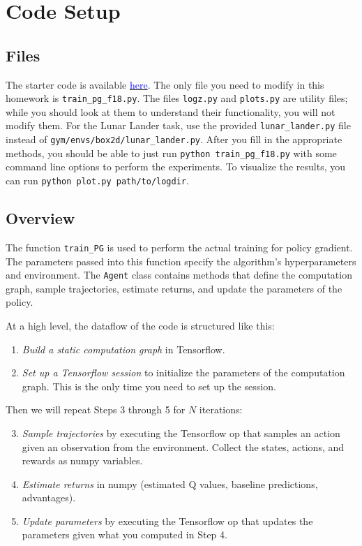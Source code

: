 \documentclass[12pt]{article}
\begin{document}
\section{Code Setup}
\subsection{Files}
The starter code is available \href{https://github.com/berkeleydeeprlcourse/homework/tree/master/hw2}{\textcolor{blue}{here}}.
The only file you need to modify in this homework is \verb|train_pg_f18.py|. The files \verb|logz.py| and \verb|plots.py| are utility files; while you should look at them to understand their functionality, you will not modify them. For the Lunar Lander task, use the provided \verb|lunar_lander.py| file instead of \verb|gym/envs/box2d/lunar_lander.py|. After you fill in the appropriate methods, you should be able to just run \verb|python train_pg_f18.py| with some command line options to perform the experiments. To visualize the results, you can run \verb|python plot.py path/to/logdir|.

\subsection{Overview}
The function \verb|train_PG| is used to perform the actual training for policy gradient. The parameters passed into this function specify the algorithm's hyperparameters and environment. The \verb|Agent| class contains methods that define the computation graph, sample trajectories, estimate returns, and update the parameters of the policy.

At a high level, the dataflow of the code is structured like this:
\begin{enumerate}
    \item \textit{Build a static computation graph} in Tensorflow.
    \item \textit{Set up a Tensorflow session} to initialize the parameters of the computation graph. This is the only time you need to set up the session.
\end{enumerate}
Then we will repeat Steps 3 through 5 for $N$ iterations:
\begin{enumerate}\setcounter{enumi}{2}
    \item \textit{Sample trajectories} by executing the Tensorflow op that samples an action given an observation from the environment. Collect the states, actions, and rewards as numpy variables.
    \item \textit{Estimate returns} in numpy (estimated Q values, baseline predictions, advantages).
    \item \textit{Update parameters} by executing the Tensorflow op that updates the parameters given what you computed in Step 4.
\end{enumerate}
\end{document}
